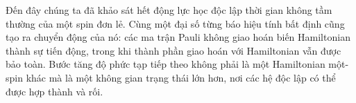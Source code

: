 \begin{classroomqa}
\end{classroomqa}

Đến đây chúng ta đã khảo sát hết động lực học độc lập thời gian không tầm thường của một spin đơn lẻ. Cùng một đại số từng báo hiệu tính bất định cũng tạo ra chuyển động của nó: các ma trận Pauli không giao hoán biến Hamiltonian thành sự tiến động, trong khi thành phần giao hoán với Hamiltonian vẫn được bảo toàn. Bước tăng độ phức tạp tiếp theo không phải là một Hamiltonian một-spin khác mà là một không gian trạng thái lớn hơn, nơi các hệ độc lập có thể được hợp thành và rối.
